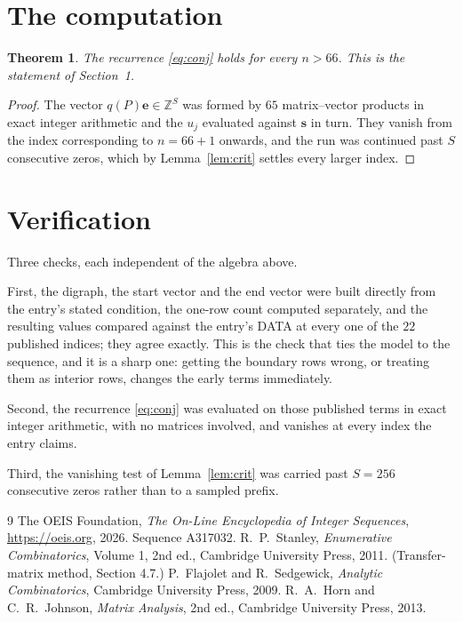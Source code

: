 \documentclass[11pt,a4paper]{article}
\theoremstyle{plain}
\newtheorem{theorem}{Theorem}
\theoremstyle{definition}
\begin{document}
\section{The computation}

\begin{theorem}
The recurrence \eqref{eq:conj} holds for every $n>66$. This is the statement of
Section~1.
\end{theorem}

\begin{proof}
The vector $q(P)\mathbf{e}\in\mathbb{Z}^{S}$ was formed by $65$ matrix--vector
products in exact integer arithmetic and the $u_j$ evaluated against $\mathbf{s}$ in turn.
They vanish from the index corresponding to $n=66+1$ onwards, and the run was continued
past $S$ consecutive zeros, which by Lemma~\ref{lem:crit} settles every larger index.
\end{proof}

\section{Verification}

Three checks, each independent of the algebra above.

First, the digraph, the start vector and the end vector were built directly from the
entry's stated condition, the one-row count computed separately, and the resulting values
compared against the entry's DATA at every one of the $22$ published indices; they
agree exactly. This is the check that ties the model to the sequence, and it is a sharp one:
getting the boundary rows wrong, or treating them as interior rows, changes the early terms
immediately.

Second, the recurrence \eqref{eq:conj} was evaluated on those published terms in exact
integer arithmetic, with no matrices involved, and vanishes at every index the entry claims.

Third, the vanishing test of Lemma~\ref{lem:crit} was carried past $S=256$ consecutive
zeros rather than to a sampled prefix.

\begin{thebibliography}{9}
 The OEIS Foundation, \emph{The On-Line Encyclopedia of Integer
Sequences}, \url{https://oeis.org}, 2026. Sequence A317032.
 R.~P.~Stanley, \emph{Enumerative Combinatorics}, Volume 1, 2nd ed.,
Cambridge University Press, 2011. (Transfer-matrix method, Section 4.7.)
 P.~Flajolet and R.~Sedgewick, \emph{Analytic Combinatorics}, Cambridge
University Press, 2009.
 R.~A.~Horn and C.~R.~Johnson, \emph{Matrix Analysis}, 2nd ed., Cambridge
University Press, 2013.
\end{thebibliography}
\end{document}
